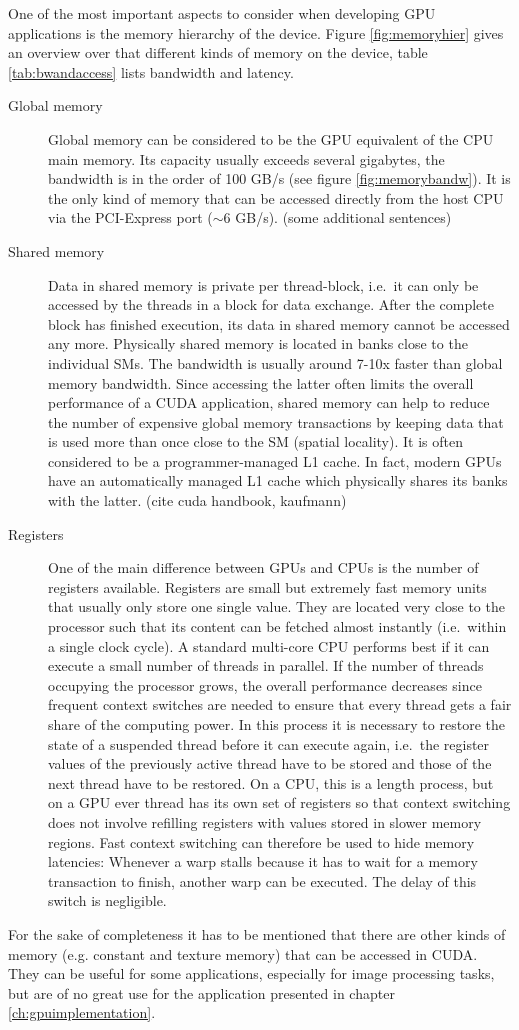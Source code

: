 One of the most important aspects to consider when developing GPU applications is the memory hierarchy of the device. Figure \ref{fig:memoryhier} gives an overview over that different kinds of memory on the device, table \ref{tab:bwandaccess} lists bandwidth and latency. 
\begin{description}
\item[Global memory] Global memory can be considered to be the GPU equivalent of the CPU main memory. Its capacity usually exceeds several gigabytes, the bandwidth is in the order of 100 GB/s (see figure \ref{fig:memorybandw}). It is the only kind of memory that can be accessed directly from the host CPU via the PCI-Express port ($\sim$6 GB/s). (some additional sentences)
\item[Shared memory] Data in shared memory is private per thread-block, i.e.\ it can only be accessed by the threads in a block for data exchange. After the complete block has finished execution, its data in shared memory cannot be accessed any more. Physically shared memory is located in banks close to the individual SMs. The bandwidth is usually around 7-10x faster than global memory bandwidth. Since accessing the latter often limits the overall performance of a CUDA application, shared memory can help to reduce the number of expensive global memory transactions by keeping data that is used more than once close to the SM (spatial locality). It is often considered to be a programmer-managed L1 cache. In fact, modern GPUs have an automatically managed L1 cache which physically shares its banks with the latter.  (cite cuda handbook, kaufmann)
\item[Registers] One of the main difference between GPUs and CPUs is the number of registers available. Registers are small but extremely fast memory units that usually only store one single value. They are located very close to the processor such that its content can be fetched almost instantly (i.e.\ within a single clock cycle). A standard multi-core CPU performs best if it can execute a small number of threads in parallel. If the number of threads occupying the processor grows, the overall performance decreases since frequent context switches are needed to ensure that every thread gets a fair share of the computing power. In this process it is necessary to restore the state of a suspended thread before it can execute again, i.e.\ the register values of the previously active thread have to be stored and those of the next thread have to be restored. On a CPU, this is a length process, but on a GPU ever thread has its own set of registers so that context switching does not involve refilling registers with values stored in slower memory regions. Fast context switching can therefore be used to hide memory latencies: Whenever a warp stalls because it has to wait for a memory transaction to finish, another warp can be executed. The delay of this switch is negligible. 
\end{description}
For the sake of completeness it has to be mentioned that there are other kinds of memory (e.g. constant and texture memory) that can be accessed in CUDA. They can be useful for some applications, especially for image processing tasks, but are of no great use for the application presented in chapter \ref{ch:gpuimplementation}. 

